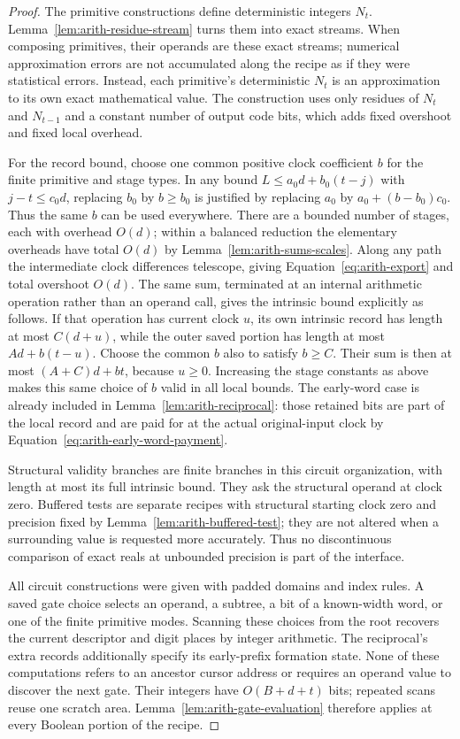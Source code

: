 \begin{proof}
The primitive constructions define deterministic integers $N_t$.
Lemma~\ref{lem:arith-residue-stream}
turns them into exact streams.  When composing primitives,
their operands are these exact streams; numerical approximation
errors are not accumulated along the recipe as if they were
statistical errors.  Instead, each primitive's deterministic
$N_t$ is an approximation to its own exact mathematical value.
The construction uses only residues of $N_t$ and $N_{t-1}$ and
a constant number of output code bits, which adds fixed
overshoot and fixed local overhead.

For the record bound, choose one common positive clock
coefficient $b$ for the finite primitive and stage types.  In any
bound $L\leq a_0d+b_0(t-j)$ with $j-t\leq c_0d$, replacing
$b_0$ by $b\geq b_0$ is justified by replacing $a_0$ by
$a_0+(b-b_0)c_0$.  Thus the same $b$ can be used everywhere.
There are a bounded number of stages, each with overhead $O(d)$;
within a balanced reduction the elementary overheads have total
$O(d)$ by Lemma~\ref{lem:arith-sums-scales}.  Along any path
the intermediate clock differences telescope, giving
Equation~\eqref{eq:arith-export} and total overshoot $O(d)$.
The same sum, terminated at an internal arithmetic operation
rather than an operand call, gives the intrinsic bound explicitly
as follows.  If that operation has current clock $u$, its own
intrinsic record has length at most $C(d+u)$, while the outer
saved portion has length at most $A d+b(t-u)$.  Choose the
common $b$ also to satisfy $b\geq C$.  Their sum is then at most
$(A+C)d+bt$, because $u\geq0$.  Increasing the stage constants
as above makes this same choice of $b$ valid in all local bounds.
The early-word case is already included in
Lemma~\ref{lem:arith-reciprocal}: those retained bits are part of
the local record and are paid for at the actual original-input
clock by Equation~\eqref{eq:arith-early-word-payment}.

Structural validity branches are finite branches in this circuit
organization, with length at most its full intrinsic bound.
They ask the structural operand at clock zero.  Buffered tests
are separate recipes with structural starting clock zero and
precision fixed by Lemma~\ref{lem:arith-buffered-test}; they are
not altered when a surrounding value is requested more accurately.
Thus no discontinuous comparison of exact reals at unbounded
precision is part of the interface.

All circuit constructions were given with padded domains and
index rules.  A saved gate choice selects an operand, a subtree,
a bit of a known-width word, or one of the finite primitive modes.
Scanning these choices from the root recovers the current
descriptor and digit places by integer arithmetic.  The
reciprocal's extra records additionally specify its early-prefix
formation state.  None of these computations refers to an
ancestor cursor address or requires an operand value to discover
the next gate.  Their integers have $O(B+d+t)$ bits; repeated
scans reuse one scratch area.  Lemma~\ref{lem:arith-gate-evaluation}
therefore applies at every Boolean portion of the recipe.


\end{proof}
